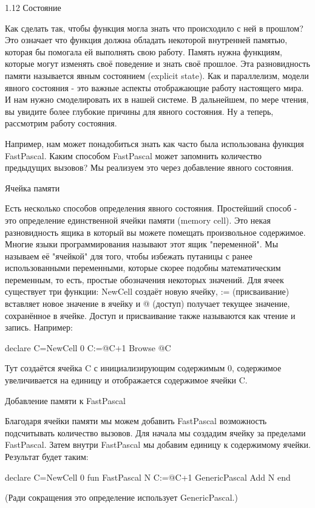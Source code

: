 1.12 Состояние

Как сделать так, чтобы функция могла знать что происходило с ней в прошлом? Это означает что функция должна обладать некоторой внутренней памятью, которая бы помогала ей выполнять свою работу. Память нужна функциям, которые могут изменять своё поведение и знать своё прошлое. Эта разновидность памяти называется явным состоянием (explicit state). Как и параллелизм, модели явного состояния - это важные аспекты отображающие работу настоящего мира. И нам нужно смоделировать их в нашей системе. В дальнейшем, по мере чтения, вы увидите более глубокие причины для явного состояния. Ну а теперь, рассмотрим работу состояния.

Например, нам может понадобиться знать как часто была использована функция FastPascal. Каким способом FastPascal может запомнить количество предыдущих вызовов? Мы реализуем это через добавление явного состояния.

Ячейка памяти

Есть несколько способов определения явного состояния. Простейший способ - это определение единственной ячейки памяти (memory cell). Это некая разновидность ящика в который вы можете помещать произвольное содержимое. Многие языки программирования называют этот ящик "переменной". Мы называем её "ячейкой" для того, чтобы избежать путаницы с ранее использованными переменными, которые скорее подобны математическим переменным, то есть, простые обозначения некоторых значений. Для ячеек существует три функции: NewCell создаёт новую ячейку, := (присваивание) вставляет новое значение в ячейку и @ (доступ) получает текущее значение, сохранённое в ячейке. Доступ и присваивание также называются как чтение и запись. Например:

declare
C={NewCell 0}
C:=@C+1
{Browse @C}

Тут создаётся ячейка C с инициализирующим содержимым 0, содержимое увеличивается на единицу и отображается содержимое ячейки C.

Добавление памяти к FastPascal

Благодаря ячейки памяти мы можем добавить FastPascal возможность подсчитывать количество вызовов. Для начала мы создадим ячейку за пределами FastPascal. Затем внутри FastPascal мы добавим единицу к содержимому ячейки. Результат будет таким:

declare
C={NewCell 0}
fun {FastPascal N}
C:=@C+1
{GenericPascal Add N}
end

(Ради сокращения это определение использует GenericPascal.)

